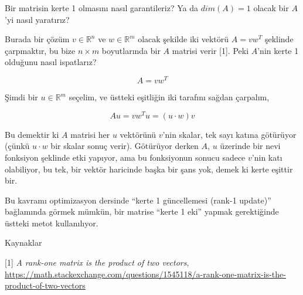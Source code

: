\documentclass[12pt,fleqn]{article}\usepackage{../../common}
\begin{document}
Bir matrisin kerte 1 olmasını nasıl garantileriz? Ya da $dim(A)=1$ olacak
bir $A$'yi nasıl yaratırız? 

Burada bir çözüm $v \in \mathbb{R}^n$ ve $w \in \mathbb{R}^m$ olacak
şekilde iki vektörü $A = v w^T$ şeklinde çarpmaktır, bu bize $n \times m$
boyutlarında bir $A$ matrisi verir [1]. Peki $A$'nin kerte 1 olduğunu nasıl
ispatlarız?

$$
A = v w^T
$$

Şimdi bir $u \in \mathbb{R}^m$ seçelim, ve üstteki eşitliğin iki tarafını
sağdan çarpalım,

$$
Au = v w^Tu = (u \cdot w) v
$$

Bu demektir ki $A$ matrisi her $u$ vektörünü $v$'nin skalar, tek sayı
katına götürüyor (çünkü $u \cdot w$ bir skalar sonuç verir). Götürüyor
derken $A$, $u$ üzerinde bir nevi fonksiyon şeklinde etki yapıyor, ama bu
fonksiyonun sonucu sadece $v$'nin katı olabiliyor, bu tek, bir vektör
haricinde başka bir şans yok, demek ki kerte eşittir bir.

Bu kavramı optimizasyon dersinde ``kerte 1 güncellemesi (rank-1 update)''
bağlamında görmek mümkün, bir matrise ``kerte 1 eki'' yapmak gerektiğinde
üstteki metot kullanılıyor.

Kaynaklar 

[1] {\em A rank-one matrix is the product of two vectors},  
    \url{https://math.stackexchange.com/questions/1545118/a-rank-one-matrix-is-the-product-of-two-vectors}
\end{document}
